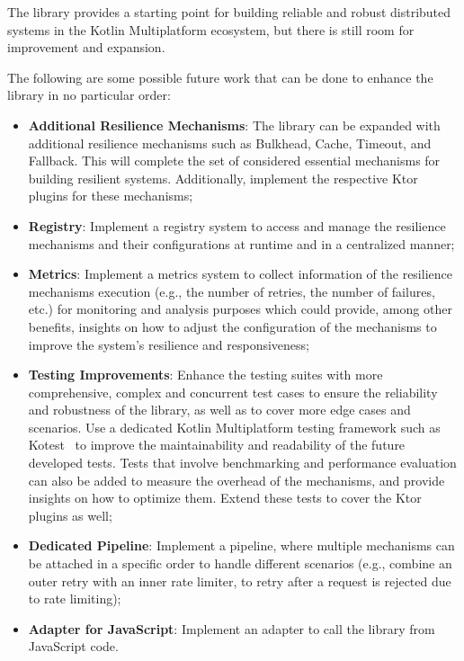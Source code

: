 The library provides a starting point for building reliable and robust distributed systems in the Kotlin Multiplatform ecosystem, but there is still room for improvement and expansion.

The following are some possible future work that can be done to enhance the library in no particular order:

\begin{itemize}
    \item \textbf{Additional Resilience Mechanisms}:
    The library can be expanded with additional resilience mechanisms such as Bulkhead,
    Cache, Timeout, and Fallback.
    This will complete the set of considered essential mechanisms for building resilient systems.
    Additionally, implement the respective Ktor plugins for these mechanisms;
    \item \textbf{Registry}:
    Implement a registry system
    to access and manage the resilience mechanisms and their configurations at runtime and in a centralized manner;
    \item \textbf{Metrics}:
    Implement a metrics system to collect information of the resilience mechanisms execution (e.g., the number of retries, the number of failures, etc.) for monitoring and analysis purposes which could provide, among other benefits, insights on how to adjust the configuration of the mechanisms to improve the system's resilience and responsiveness;
    \item \textbf{Testing Improvements}:
    Enhance the testing suites with more comprehensive, complex and concurrent test cases
    to ensure the reliability and robustness of the library, as well as to cover more edge cases and scenarios.
    Use a dedicated Kotlin Multiplatform testing framework such as Kotest~\cite{kotest}
    to improve the maintainability and readability of the future developed tests.
    Tests that involve benchmarking and performance evaluation can also be added to measure the overhead of the mechanisms,
    and provide insights on how to optimize them.
    Extend these tests to cover the Ktor plugins as well;
    \item \textbf{Dedicated Pipeline}:
    Implement a pipeline,
    where multiple mechanisms can be attached in a specific order to handle different scenarios (e.g., combine an outer retry with an inner rate limiter, to retry after a request is rejected due to rate limiting);
    \item \textbf{Adapter for JavaScript}: Implement an adapter to call the library from JavaScript code.

\end{itemize}

